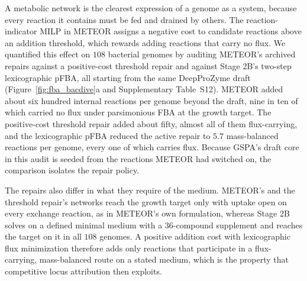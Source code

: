 \documentclass[10pt,twocolumn]{article}
\begin{document}


A metabolic network is the clearest expression of a genome as a system, because every reaction it contains must be fed and drained by others. The reaction-indicator MILP in METEOR assigns a negative cost to candidate reactions above an addition threshold, which rewards adding reactions that carry no flux. We quantified this effect on $108$ bacterial genomes by auditing METEOR's archived repairs against a positive-cost threshold repair and against Stage 2B's two-step lexicographic pFBA, all starting from the same DeepProZyme draft (Figure~\ref{fig:fba_bacdive}a and Supplementary Table~S12). METEOR added about six hundred internal reactions per genome beyond the draft, nine in ten of which carried no flux under parsimonious FBA at the growth target. The positive-cost threshold repair added about fifty, almost all of them flux-carrying, and the lexicographic pFBA reduced the active repair to $5.7$ mass-balanced reactions per genome, every one of which carries flux. Because GSPA's draft core in this audit is seeded from the reactions METEOR had switched on, the comparison isolates the repair policy.

The repairs also differ in what they require of the medium. METEOR's and the threshold repair's networks reach the growth target only with uptake open on every exchange reaction, as in METEOR's own formulation, whereas Stage 2B solves on a defined minimal medium with a $36$-compound supplement and reaches the target on it in all $108$ genomes. A positive addition cost with lexicographic flux minimization therefore adds only reactions that participate in a flux-carrying, mass-balanced route on a stated medium, which is the property that competitive locus attribution then exploits.
\end{document}

